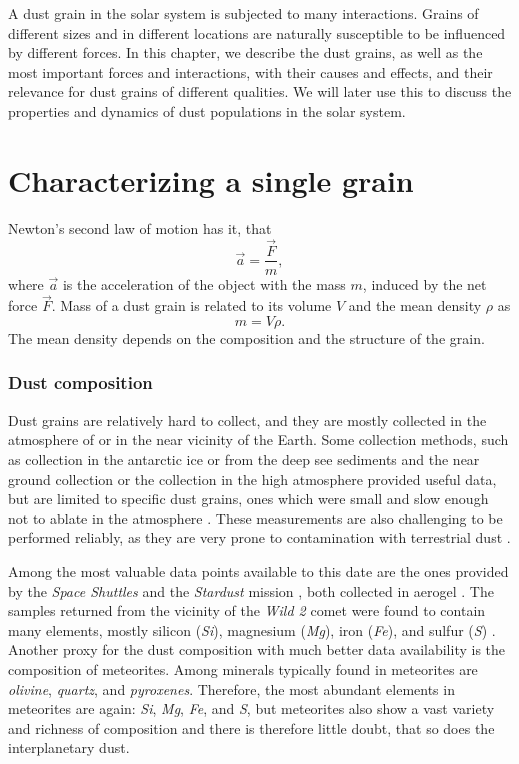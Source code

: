 A dust grain in the solar system is subjected to many interactions. Grains of different sizes and in different locations are naturally susceptible to be influenced by different forces. In this chapter, we describe the dust grains, as well as the most important forces and interactions, with their causes and effects, and their relevance for dust grains of different qualities. We will later use this to discuss the properties and dynamics of dust populations in the solar system. 

\section{Characterizing a single grain}

Newton's second law of motion has it, that
\begin{equation}
\vec{a} = \frac{\vec{F}}{m},
\end{equation}
where $\vec{a}$ is the acceleration of the object with the mass $m$, induced by the net force $\vec{F}$. Mass of a dust grain is related to its volume $V$ and the mean density $\rho$ as
\begin{equation}
    m = V \rho.
\end{equation}
The mean density depends on the composition and the structure of the grain. 

\subsubsection{Dust composition}

Dust grains are relatively hard to collect, and they are mostly collected in the atmosphere of or in the near vicinity of the Earth. Some collection methods, such as collection in the antarctic ice or from the deep see sediments \citep{brownlee1985cosmic} and the near ground collection \citep{pettersson1958rate} or the collection in the high atmosphere \citep{fechtig1968results} provided useful data, but are limited to specific dust grains, ones which were small and slow enough not to ablate in the atmosphere \citep{vondrak2008chemical}. These measurements are also challenging to be performed reliably, as they are very prone to contamination with terrestrial dust \citep{taylor2016cosmic}. 

Among the most valuable data points available to this date are the ones provided by the \textit{Space Shuttles} \citep{mcdonnell1984cosmic} and the \textit{Stardust} mission \citep{brownlee2014stardust}, both collected in aerogel \citep{tsou1995silica}. The samples returned from the vicinity of the \textit{Wild 2} comet were found to contain many elements, mostly silicon (\textit{Si}), magnesium (\textit{Mg}), iron (\textit{Fe}), and sulfur (\textit{S}) \citep{keller2006infrared}. Another proxy for the dust composition with much better data availability is the composition of meteorites. Among minerals typically found in meteorites are \textit{olivine}, \textit{quartz}, and \textit{pyroxenes}. Therefore, the most abundant elements in meteorites are again: \textit{Si}, \textit{Mg}, \textit{Fe}, and \textit{S}, but meteorites also show a vast variety and richness of composition \citep{anders1964origin} and there is therefore little doubt, that so does the interplanetary dust. 

